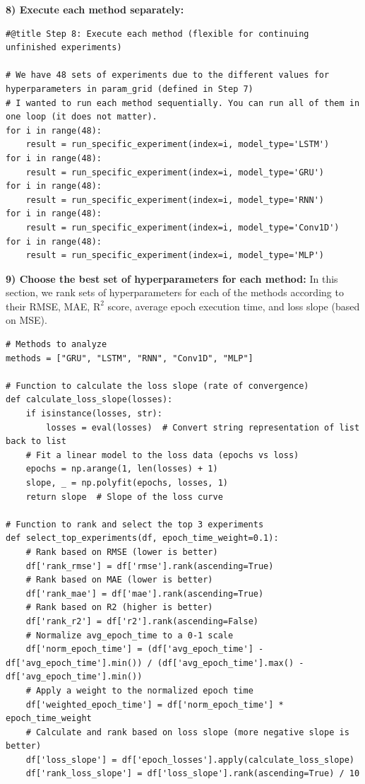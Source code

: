 \documentclass[journal,onecolumn]{IEEEtran}
\begin{document}
{\begin{appendices}
\textbf{8) Execute each method separately: } 
\begin{verbatim}
#@title Step 8: Execute each method (flexible for continuing unfinished experiments)

# We have 48 sets of experiments due to the different values for hyperparameters in param_grid (defined in Step 7)
# I wanted to run each method sequentially. You can run all of them in one loop (it does not matter).
for i in range(48):
    result = run_specific_experiment(index=i, model_type='LSTM')
for i in range(48):
    result = run_specific_experiment(index=i, model_type='GRU')
for i in range(48):
    result = run_specific_experiment(index=i, model_type='RNN')
for i in range(48): 
    result = run_specific_experiment(index=i, model_type='Conv1D')
for i in range(48):
    result = run_specific_experiment(index=i, model_type='MLP')
\end{verbatim}

\textbf{9) Choose the best set of hyperparameters for each method: } In this section, we rank sets of hyperparameters for each of the methods according to their RMSE, MAE, $\text{R}^2$ score, average epoch execution time, and loss slope (based on MSE). 
\begin{verbatim}
# Methods to analyze
methods = ["GRU", "LSTM", "RNN", "Conv1D", "MLP"]

# Function to calculate the loss slope (rate of convergence)
def calculate_loss_slope(losses):
    if isinstance(losses, str):
        losses = eval(losses)  # Convert string representation of list back to list
    # Fit a linear model to the loss data (epochs vs loss)
    epochs = np.arange(1, len(losses) + 1)
    slope, _ = np.polyfit(epochs, losses, 1)
    return slope  # Slope of the loss curve

# Function to rank and select the top 3 experiments
def select_top_experiments(df, epoch_time_weight=0.1):
    # Rank based on RMSE (lower is better)
    df['rank_rmse'] = df['rmse'].rank(ascending=True)
    # Rank based on MAE (lower is better)
    df['rank_mae'] = df['mae'].rank(ascending=True)
    # Rank based on R2 (higher is better)
    df['rank_r2'] = df['r2'].rank(ascending=False)
    # Normalize avg_epoch_time to a 0-1 scale
    df['norm_epoch_time'] = (df['avg_epoch_time'] - df['avg_epoch_time'].min()) / (df['avg_epoch_time'].max() - df['avg_epoch_time'].min())
    # Apply a weight to the normalized epoch time
    df['weighted_epoch_time'] = df['norm_epoch_time'] * epoch_time_weight
    # Calculate and rank based on loss slope (more negative slope is better)
    df['loss_slope'] = df['epoch_losses'].apply(calculate_loss_slope)
    df['rank_loss_slope'] = df['loss_slope'].rank(ascending=True) / 10
    

\end{verbatim}
\end{appendices}}
\end{document}
